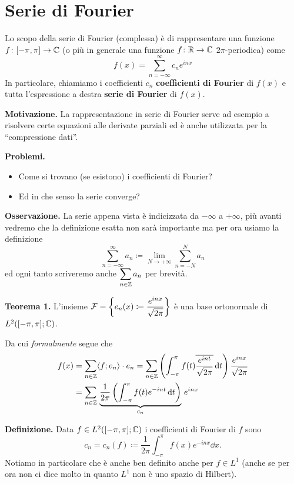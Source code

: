 %
%


\chapter{Serie di Fourier}

Lo scopo della serie di Fourier (complessa) è di rappresentare una funzione $f \colon [-\pi, \pi] \to \mathbb C$ (o più in generale una funzione $f \colon \mathbb R \to \mathbb C$ $2\pi$-periodica) come
$$
f(x) = \sum_{n=-\infty}^\infty c_n e^{i n x}
$$
In particolare, chiamiamo i coefficienti $c_n$ \textbf{coefficienti di Fourier} di $f(x)$ e tutta l'espressione a destra \textbf{serie di Fourier} di $f(x)$.

\textbf{Motivazione.}
La rappresentazione in serie di Fourier serve ad esempio a risolvere certe equazioni alle derivate parziali ed è anche utilizzata per la ``compressione dati''.

\textbf{Problemi.}
\begin{itemize}
	\item Come si trovano (se esistono) i coefficienti di Fourier?
	\item Ed in che senso la serie converge?
\end{itemize}

\textbf{Osservazione.}
La serie appena vista è indicizzata da $-\infty$ a $+\infty$, più avanti vedremo che la definizione esatta non sarà importante ma per ora usiamo la definizione
$$
\sum_{n=-\infty}^\infty a_n \coloneqq \lim_{N \to +\infty} \sum_{n = -N}^N a_n
$$
ed ogni tanto scriveremo anche $\displaystyle \sum_{n \in \mathbb Z} a_n$ per brevità.

\textbf{Teorema 1.}
L'insieme $\displaystyle\mathcal F = \left\{ e_n(x) \coloneqq \frac{e^{inx}}{\sqrt{2\pi}} \right\}$ è una base ortonormale di $L^2([-\pi, \pi]; \mathbb C)$.

Da cui \textit{formalmente} segue che
$$
\begin{aligned}
	f(x) 
	&= \sum_{n \in \mathbb Z} \langle f; e_n \rangle \cdot e_n
	= \sum_{n \in \mathbb Z} \left( \int_{-\pi}^\pi f(t) \overline{\frac{e^{int}}{\sqrt{2\pi}}} \,\mathrm{d} t \right) \frac{e^{inx}}{\sqrt{2\pi}} \\
	&= \sum_{n \in \mathbb Z} \, \underbrace{\frac{1}{2\pi} \left( \int_{-\pi}^\pi f(t) e^{-int} \,\mathrm{d} t \right)}_{c_n} \, e^{inx}
\end{aligned}
$$

\textbf{Definizione.}
Data $f \in L^2([-\pi, \pi]; \mathbb C)$ i coefficienti di Fourier di $f$ sono
$$
	c_n = c_n(f) \coloneqq \frac{1}{2\pi} \int_{-\pi}^\pi f(x) e^{-inx} \dd x.
$$
Notiamo in particolare che è anche ben definito anche per $f \in L^1$ (anche se per ora non ci dice molto in quanto $L^1$ non è uno spazio di Hilbert).


